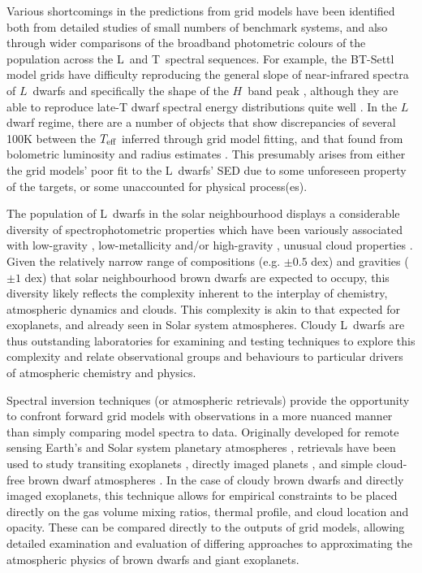 \documentclass[useAMS,usenatbib]{mn2e}
\begin{document}
Various shortcomings in the predictions from grid models have been identified both from detailed studies of small numbers of benchmark systems, and also through wider comparisons of the broadband photometric colours of the population across the L~and T~spectral sequences. For example, the BT-Settl model grids \citep{btsettlCS16} have difficulty reproducing the general slope of near-infrared spectra of $L$~dwarfs and specifically the shape of the $H$~band peak \citep{manjavacas2014,manjavacas2016}, although they are able to reproduce late-T dwarf spectral energy distributions quite well \citep[e.g.][]{ben2011b}. In the $L$ dwarf regime, there are a number of objects that show discrepancies of several 100K between the $T_{\rm eff}$ inferred through grid model fitting, and that found from bolometric luminosity and radius estimates \citep[including an object we consider in this paper: 2MASSW~J2224438-015852; ][]{stephens2009}. This presumably arises from either the grid models' poor fit to the L~dwarfs' SED due to some unforeseen property of the targets, or some unaccounted for physical process(es).  

The population of L~dwarfs in the solar neighbourhood displays a considerable diversity of spectrophotometric properties which have been variously associated with low-gravity \citep[red $J-K$ colours; e.g. ][]{faherty2013,allers2013}, low-metallicity and/or high-gravity \citep[blue $J-K$ colours; e.g. ][]{faherty2009}, unusual cloud properties \citep[blue $J-K$ colours; e.g. ][]{burgasser2008,cushing2010,marley2010}. Given the relatively narrow range of compositions (e.g. $\pm 0.5$ dex) and gravities ($\pm 1$ dex) that solar neighbourhood brown dwarfs are expected to occupy, this diversity likely reflects the complexity inherent to the interplay of chemistry, atmospheric dynamics and clouds.  This complexity is akin to that expected for exoplanets, and already seen in Solar system atmospheres. Cloudy L~dwarfs are thus outstanding laboratories for examining and testing techniques to explore this complexity and relate observational groups and behaviours to particular drivers of atmospheric chemistry and physics. 


Spectral inversion techniques (or atmospheric retrievals) provide the opportunity to confront forward grid models with observations in a more nuanced manner than simply comparing model spectra to data. Originally developed for remote sensing Earth's \citep[e.g.][]{rodgers1976,rodgers2000} and Solar system planetary atmospheres \citep[e.g.][]{irwin2008}, retrievals have been used to study transiting exoplanets \citep[e.g.][]{barstow2013,line2013}, directly imaged planets \cite{lee2013}, and simple cloud-free brown dwarf atmospheres \citep{line2014,line2015}.  In the case of cloudy brown dwarfs and directly imaged exoplanets, this technique allows for empirical constraints to be placed directly on the gas volume mixing ratios, thermal profile,  and cloud location and opacity. These can be compared directly to the outputs of grid models, allowing detailed examination and evaluation of differing approaches to approximating the atmospheric physics of brown dwarfs and giant exoplanets. 
\end{document}
